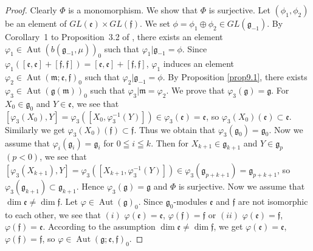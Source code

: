 \documentclass[pdftex]{sigma}
\numberwithin{equation}{section}
\numberwithin{theorem}{section}
\numberwithin{proposition}{section}
\numberwithin{lemma}{section}
\numberwithin{corollary}{section}
\numberwithin{definition}{section}
\numberwithin{example}{section}
\numberwithin{remark}{section}
\numberwithin{note}{section}
\newcommand{\Aut}{\operatorname{Aut}}
\begin{document}
\begin{proof}
Clearly $\Phi$ is a monomorphism.
We show that $\Phi$ is surjective.
Let $(\phi_1,\phi_2)$ be an element of
$GL(\mathfrak e)\times GL(\mathfrak f)$.
We set $\phi=\phi_1\oplus\phi_2\in GL(\mathfrak g_{-1})$.
By Corollary~1 to Proposition~3.2 of \cite{tan70:1},
there exists an element
$\varphi_1\in \Aut(b(\mathfrak g_{-1},\mu))_0$ such that
$\varphi_1|\mathfrak g_{-1}=\phi$.
Since $\varphi_1([\mathfrak e,\mathfrak e]+[\mathfrak f,\mathfrak f])=
[\mathfrak e,\mathfrak e]+[\mathfrak f,\mathfrak f]$,
$\varphi_1$ induces an element
$\varphi_2\in \Aut(\mathfrak m;\mathfrak e,\mathfrak f)_0$
such that $\varphi_2|\mathfrak g_{-1}=\phi$.
By Proposition \ref{prop9.1}, there exists
$\varphi_3\in \Aut(\mathfrak g(\mathfrak m))_0$
such that $\varphi_3|\mathfrak m=\varphi_2$.
We prove that $\varphi_3(\mathfrak g)=\mathfrak g$.
For $X_0\in\mathfrak g_0$ and $Y\in\mathfrak e$,
we see that $[\varphi_3(X_0),Y]=\varphi_3([X_0,\varphi_3^{-1}(Y)])\in
\varphi_3(\mathfrak e)=\mathfrak e$, so
$\varphi_3(X_0)(\mathfrak e)\subset \mathfrak e$.
Similarly we get $\varphi_3(X_0)(\mathfrak f)\subset \mathfrak f$.
Thus we obtain that $\varphi_3(\mathfrak g_0)=\mathfrak g_0$.
Now we assume that $\varphi_i(\mathfrak g_i)=\mathfrak g_i$
for $0\leqq i\leqq k$. Then
for $X_{k+1}\in\mathfrak g_{k+1}$ and $Y\in\mathfrak g_{p}$ $(p<0)$,
we see that $[\varphi_3(X_{k+1}),Y]=\varphi_3([X_{k+1},\varphi_3^{-1}(Y)])\in
\varphi_3(\mathfrak g_{p+k+1})=\mathfrak g_{p+k+1}$, so
$\varphi_3(\mathfrak g_{k+1})\subset \mathfrak g_{k+1}$.
Hence $\varphi_3(\mathfrak g)=\mathfrak g$ and $\Phi$ is surjective.
Now we assume that $\dim\mathfrak e\ne\dim \mathfrak f$.
Let $\varphi\in\Aut(\mathfrak g)_0$.
Since $\mathfrak g_0$-modules $\mathfrak e$ and $\mathfrak f$ are not
isomorphic to each other, we see that
$(i)$ $\varphi(\mathfrak e)=\mathfrak e$, $\varphi(\mathfrak f)=\mathfrak f$ or
$(ii)$ $\varphi(\mathfrak e)=\mathfrak f$, $\varphi(\mathfrak f)=\mathfrak e$.
According to the assumption $\dim\mathfrak e\ne\dim\mathfrak f$,
we get $\varphi(\mathfrak e)=\mathfrak e$, $\varphi(\mathfrak f)=\mathfrak f$,
so $\varphi\in \Aut(\mathfrak g;\mathfrak e,\mathfrak f)_0$.
\end{proof}
\end{document}
